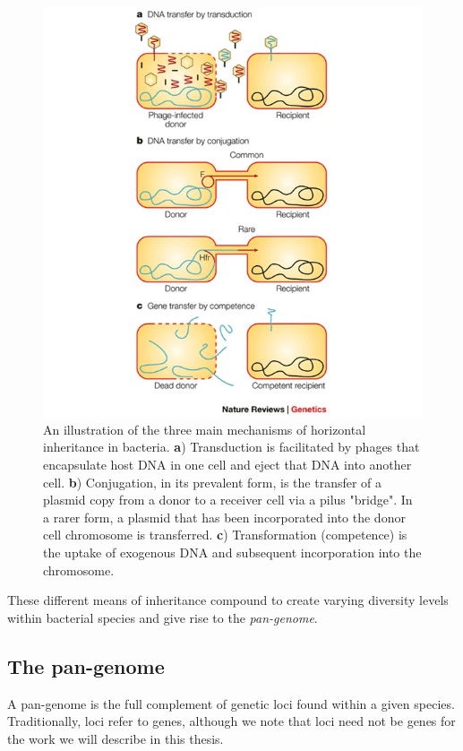 \begin{figure}
\begin{center}
\includegraphics[width=0.8\columnwidth]{Chapter0/Figs/methods-of-dna-transfer.png}
\caption{{An illustration of the three main mechanisms of horizontal inheritance in bacteria. \textbf{a}) Transduction is facilitated by phages that encapsulate host DNA in one cell and eject that DNA into another cell. \textbf{b}) Conjugation, in its prevalent form, is the transfer of a plasmid copy from a donor to a receiver cell via a pilus "bridge". In a rarer form, a plasmid that has been incorporated into the donor cell chromosome is transferred. \textbf{c}) Transformation (competence) is the uptake of exogenous DNA and subsequent incorporation into the chromosome.}
{\label{fig:horizontal-inheritance}}
}
\end{center}
\end{figure}

\noindent
These different means of inheritance compound to create varying diversity levels within bacterial species and give rise to the \emph{pan-genome}.

\subsection{The pan-genome}

A pan-genome is the full complement of genetic loci found within a given species. Traditionally, loci refer to genes, although we note that loci need not be genes for the work we will describe in this thesis.

